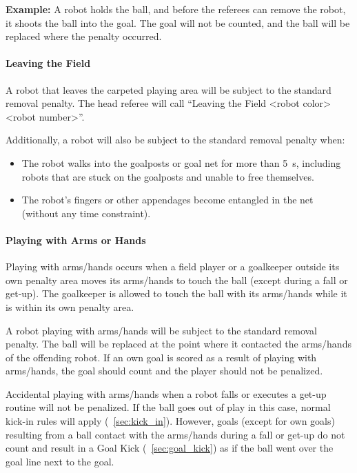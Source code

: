 \textbf{Example:} A robot holds the ball, and before the referees can remove the robot, it shoots the ball into the goal. The goal will not be counted, and the ball will be replaced where the penalty occurred.

\paragraph{Leaving the Field}
\label{sec:leaving_the_field}

A robot that leaves the carpeted playing area will be subject to the standard removal penalty. The head referee will call ``Leaving the Field \textless robot color\textgreater \textless robot number\textgreater''.

Additionally, a robot will also be subject to the standard removal penalty when:
\begin{itemize}
	\item The robot walks into the goalposts or goal net for more than \qty{5}{\second}, including robots that are stuck on the goalposts and unable to free themselves.
	\item The robot's fingers or other appendages become entangled in the net (without any time constraint).
\end{itemize}

\paragraph{Playing with Arms or Hands}
\label{sec:playing_with_hands}

Playing with arms/hands occurs when a field player or a goalkeeper outside its own penalty area moves its arms/hands to touch the ball (except during a fall or get-up). The goalkeeper is allowed to touch the ball with its arms/hands while it is within its own penalty area.

A robot playing with arms/hands will be subject to the standard removal penalty. The ball will be replaced at the point where it contacted the arms/hands of the offending robot. If an own goal is scored as a result of playing with arms/hands, the goal should count and the player should not be penalized. 

Accidental playing with arms/hands when a robot falls or executes a get-up routine will not be penalized. If the ball goes out of play in this case, normal kick-in rules will apply (\cf~\cref{sec:kick_in}). However, goals (except for own goals) resulting from a ball contact with the arms/hands during a fall or get-up do not count and result in a Goal Kick (\cf~\cref{sec:goal_kick}) as if the ball went over the goal line next to the goal.

